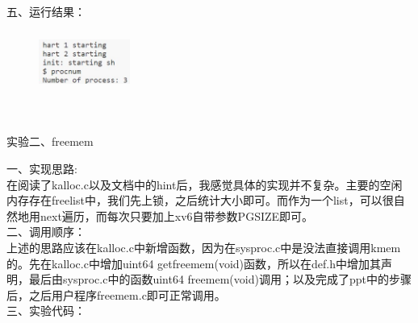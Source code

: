 \documentclass[12pt]{article}
\begin{document}
\noindent 五、运行结果：
\begin{figure}[htbp]
    \centering
    \includegraphics[width=3cm,height=2cm]{lab2-3.jpg}
\end{figure}\\
\begin{Large}
    \noindent 实验二、freemem\\
\end{Large}
\noindent 一、实现思路:\\
\hspace*{2em}在阅读了kalloc.c以及文档中的hint后，我感觉具体的实现并不复杂。主要的空闲内存存在freelist中，我们先上锁，之后统计大小即可。而作为一个list，可以很自然地用next遍历，而每次只要加上xv6自带参数PGSIZE即可。\\
\noindent 二、调用顺序：\\
\hspace*{2em}上述的思路应该在kalloc.c中新增函数，因为在sysproc.c中是没法直接调用kmem的。先在kalloc.c中增加uint64 getfreemem(void)函数，所以在def.h中增加其声明，最后由sysproc.c中的函数uint64 freemem(void)调用；以及完成了ppt中的步骤后，之后用户程序freemem.c即可正常调用。\\
\noindent 三、实验代码：
\begin{figure}[!h]
    \centering
    \hfill
\end{figure}\\
\end{document}
